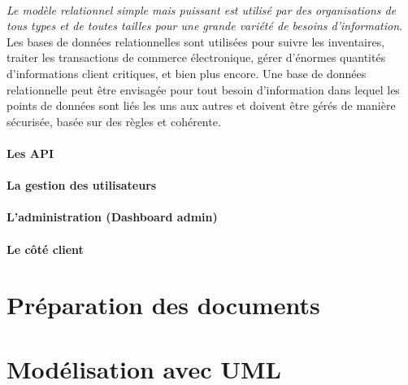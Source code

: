                 \paragraph{}
                 \textit{Le modèle relationnel simple mais puissant est utilisé par des organisations 
                 de tous types et de toutes tailles pour une grande variété de besoins d'information}\cite{Oracle}.
                  Les bases de données relationnelles sont utilisées pour suivre les inventaires, 
                  traiter les transactions de commerce électronique, gérer d'énormes quantités d'informations
                   client critiques, et bien plus encore. Une base de données relationnelle peut être envisagée 
                   pour tout besoin d'information dans lequel les points de données sont liés les uns 
                   aux autres et doivent être gérés de manière sécurisée, basée sur des règles et cohérente.

                \paragraph{Les API}
                \paragraph{La gestion des utilisateurs}
                \paragraph{L'administration (Dashboard admin)}
                \paragraph{Le côté client}
                

        \section{Préparation des documents}
                
        \section{Modélisation avec UML}
        
        
 